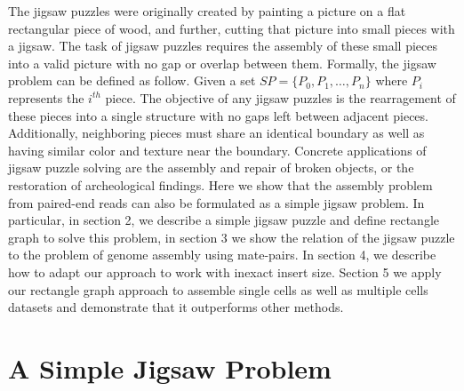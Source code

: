 \documentclass[a4paper]{article}
\begin{document}
The jigsaw puzzles were originally created by painting a picture on a flat rectangular piece of wood, 
and further, cutting that picture into
small pieces with a jigsaw. The task of jigsaw puzzles requires the assembly of these small pieces into a valid picture with no gap or overlap between
them. Formally, the jigsaw problem can be defined as follow. Given a set $SP = \{ P_0, P_1,\ldots, P_n\}$ where $P_i$ represents the $i^{th}$ piece.
The objective of any jigsaw puzzles is the rearragement of these pieces into a single structure with no gaps left between adjacent pieces. Additionally,
neighboring pieces must share an identical boundary as well as having similar color and 
texture near the boundary.
Concrete applications of jigsaw puzzle solving are the assembly and repair of broken objects, 
or the restoration of archeological findings. Here we show
that the assembly problem from paired-end reads can also be formulated as a simple jigsaw problem. %
In particular, in section 2, we describe a simple jigsaw puzzle and define rectangle graph to solve this 
problem, in section 3 we show the relation of the jigsaw puzzle to the 
problem of genome assembly using mate-pairs. In section 4, we describe how to adapt our approach 
to work with inexact insert size. Section 5 we apply our rectangle graph approach to 
assemble single cells as well as multiple cells datasets and demonstrate that it outperforms
other methods.

\section{A Simple Jigsaw Problem}
\end{document}
